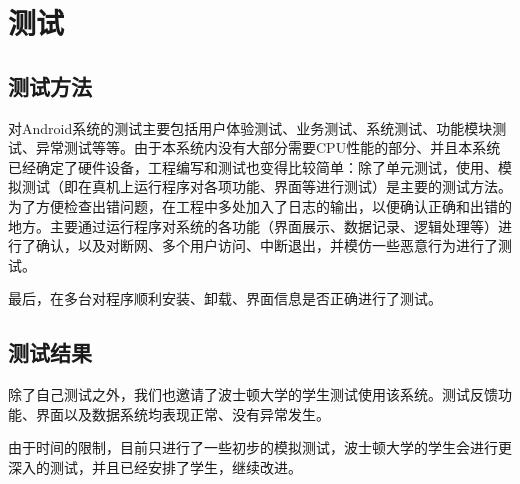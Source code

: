 

\chapter{测试}

\section{测试方法}

对Android系统的测试主要包括用户体验测试、业务测试、系统测试、功能模块测试、异常测试等等。由于本系统内没有大部分需要CPU性能的部分、并且本系统已经确定了硬件设备，工程编写和测试也变得比较简单：除了单元测试，使用、模拟测试（即在真机上运行程序对各项功能、界面等进行测试）是主要的测试方法。为了方便检查出错问题，在工程中多处加入了日志的输出，以便确认正确和出错的地方。主要通过运行程序对系统的各功能（界面展示、数据记录、逻辑处理等）进行了确认，以及对断网、多个用户访问、中断退出，并模仿一些恶意行为进行了测试。

最后，在多台对程序顺利安装、卸载、界面信息是否正确进行了测试。

\section{测试结果}

除了自己测试之外，我们也邀请了波士顿大学的学生测试使用该系统。测试反馈功能、界面以及数据系统均表现正常、没有异常发生。

由于时间的限制，目前只进行了一些初步的模拟测试，波士顿大学的学生会进行更深入的测试，并且已经安排了学生，继续改进。


